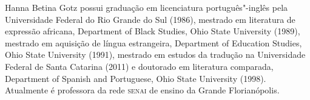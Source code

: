 \begin{resumopage}
\item[Hanna Betina Gotz] possui graduação em licenciatura português"-inglês pela
Universidade Federal do Rio Grande do Sul (1986), mestrado em literatura de
expressão africana, Department of Black Studies, Ohio State University (1989),
mestrado em aquisição de língua estrangeira, Department of Education Studies,
Ohio State University (1991), mestrado em estudos da tradução na Universidade
Federal de Santa Catarina (2011) e doutorado em literatura comparada, Department
of Spanish and Portuguese, Ohio State University (1998). Atualmente é professora
da rede \textsc{senai} de ensino da Grande Florianópolis.

\end{resumopage}
